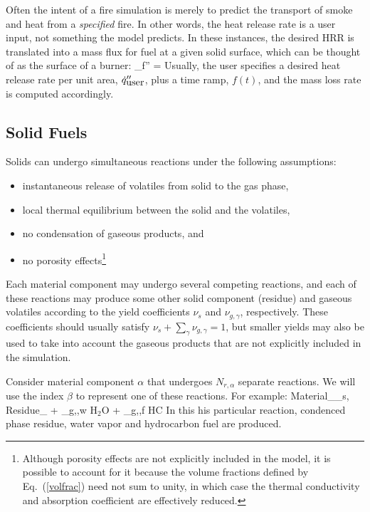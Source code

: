 Often the intent of a fire simulation is merely to predict the
transport of smoke and heat from a {\em specified} fire. In other
words, the heat release rate is a user input, not something the model
predicts. In these instances, the desired HRR is translated into a
mass flux for fuel at a given solid surface, which can be thought of
as the surface of a burner: \be \dm_f'' =  \ee Usually, the user specifies a
desired heat release rate per unit area, $\dot{q}_{\hbox{user}}''$, plus a
time ramp, $f(t)$, and the mass loss rate is computed accordingly.

\subsection{Solid Fuels}

Solids can undergo simultaneous reactions under the following assumptions:
\begin{itemize}
\setlength{\itemsep}{0.0in}
\item instantaneous release of volatiles from solid to the gas phase,
\item local thermal equilibrium between the solid and the volatiles,
\item no condensation of gaseous products, and
\item no porosity effects\footnote{Although porosity effects are not explicitly included in the model, it is possible to account for it
because the volume fractions defined by Eq.~(\ref{volfrac}) need not
sum to unity, in which case the thermal conductivity and absorption
coefficient are effectively reduced.}
\end{itemize}
Each material component may undergo several competing reactions, and
each of these reactions may produce some other solid component
(residue) and gaseous volatiles according to the yield coefficients
$\nu_s$ and $\nu_{g,\gamma}$, respectively.  These coefficients should
usually satisfy $\nu_s + \sum_\gamma \nu_{g,\gamma} = 1$, but smaller yields may
also be used to take into account the gaseous products that are not
explicitly included in the simulation.

Consider material component $\alpha$ that undergoes $N_{r,\alpha}$ separate reactions. We will use the index $\beta$ to represent one of
these reactions. For example:
\be \hbox{Material}_\alpha \rightarrow \nu_{s,\alpha \beta} \;
    \hbox{Residue}_{\alpha \beta} + \nu_{g,\alpha \beta,w} \; \hbox{H$_2$O} + \nu_{g,\alpha \beta,f} \; \hbox{HC} \ee
In this his particular reaction, condenced phase residue, water vapor
and hydrocarbon fuel are produced.

